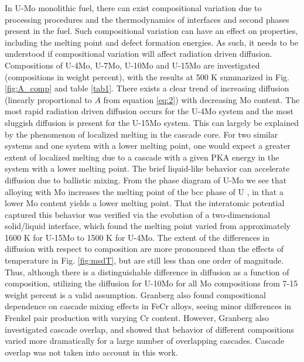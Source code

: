 \documentclass[review]{elsarticle}
\begin{document}
In U-Mo monolithic fuel, there can exist compositional variation due to processing procedures and the thermodynamics of interfaces and second phases present in the fuel. Such compositional variation can have an effect on properties, including the melting point and defect formation energies. As such, it needs to be understood if compositional variation will affect radiation driven diffusion. Compositions of U-4Mo, U-7Mo, U-10Mo and U-15Mo are investigated (compositions in weight percent), with the results at 500 K summarized in Fig. \ref{fig:A_comp} and table \ref{tab1}. There exists a clear trend of increasing diffusion (linearly proportional to $A$ from equation \ref{eq:2}) with decreasing Mo content. The most rapid radiation driven diffusion occurs for the U-4Mo system and the most sluggish diffusion is present for the U-15Mo system. This can largely be explained by the phenomenon of localized melting in the cascade core. For two similar systems and one system with a lower melting point, one would expect a greater extent of localized melting due to a cascade with a given PKA energy in the system with a lower melting point. The brief liquid-like behavior can accelerate diffusion due to ballistic mixing. From the phase diagram of U-Mo we see that alloying with Mo increases the melting point of the bcc phase of U \cite{umo_handbook}, in that a lower Mo content yields a lower melting point. That the interatomic potential captured this behavior was verified via the evolution of a two-dimensional solid/liquid interface, which found the melting point varied from approximately 1600 K for U-15Mo to 1500 K for U-4Mo. The extent of the differences in diffusion with respect to composition are more pronounced than the effects of temperature in Fig. \ref{fig:msdT}, but are still less than one order of magnitude. Thus, although there is a distinguishable difference in diffusion as a function of composition, utilizing the diffusion for U-10Mo for all Mo compositions from 7-15 weight percent is a valid assumption. Granberg \cite{granberg2020} also found compositional dependence on cascade mixing effects in FeCr alloys, seeing minor differences in Frenkel pair production with varying Cr content. However, Granberg also investigated cascade overlap, and showed that behavior of different compositions varied more dramatically for a large number of overlapping cascades. Cascade overlap was not taken into account in this work. 
\end{document}
